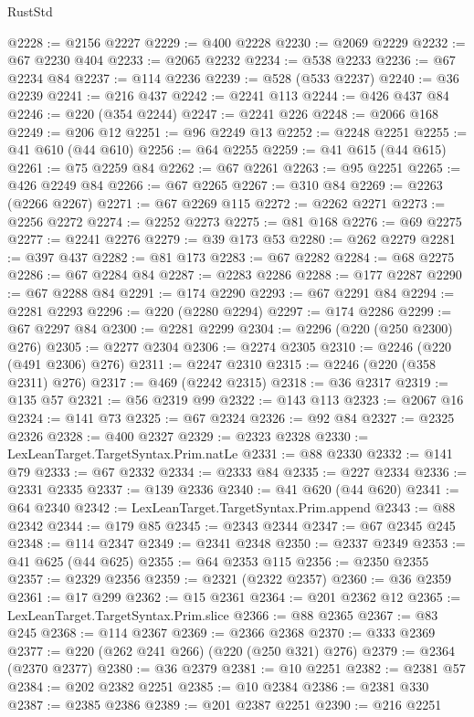 \begin{lexlean}{RustStd}
\begin{coremodule}
{\begin{coremodule}
{{{{{{{{{{{{{{{{{{{{{{{{{{@2228 := @2156 @2227
@2229 := @400 @2228
@2230 := @2069 @2229
@2232 := @67 @2230 @404
@2233 := @2065 @2232
@2234 := @538 @2233
@2236 := @67 @2234 @84
@2237 := @114 @2236
@2239 := @528 (@533 @2237)
@2240 := @36 @2239
@2241 := @216 @437
@2242 := @2241 @113
@2244 := @426 @437 @84
@2246 := @220 (@354 @2244)
@2247 := @2241 @226
@2248 := @2066 @168
@2249 := @206 @12
@2251 := @96 @2249 @13
@2252 := @2248 @2251
@2255 := @41 @610 (@44 @610)
@2256 := @64 @2255
@2259 := @41 @615 (@44 @615)
@2261 := @75 @2259 @84
@2262 := @67 @2261
@2263 := @95 @2251
@2265 := @426 @2249 @84
@2266 := @67 @2265
@2267 := @310 @84
@2269 := @2263 (@2266 @2267)
@2271 := @67 @2269 @115
@2272 := @2262 @2271
@2273 := @2256 @2272
@2274 := @2252 @2273
@2275 := @81 @168
@2276 := @69 @2275
@2277 := @2241 @2276
@2279 := @39 @173 @53
@2280 := @262 @2279
@2281 := @397 @437
@2282 := @81 @173
@2283 := @67 @2282
@2284 := @68 @2275
@2286 := @67 @2284 @84
@2287 := @2283 @2286
@2288 := @177 @2287
@2290 := @67 @2288 @84
@2291 := @174 @2290
@2293 := @67 @2291 @84
@2294 := @2281 @2293
@2296 := @220 (@2280 @2294)
@2297 := @174 @2286
@2299 := @67 @2297 @84
@2300 := @2281 @2299
@2304 := @2296 (@220 (@250 @2300) @276)
@2305 := @2277 @2304
@2306 := @2274 @2305
@2310 := @2246 (@220 (@491 @2306) @276)
@2311 := @2247 @2310
@2315 := @2246 (@220 (@358 @2311) @276)
@2317 := @469 (@2242 @2315)
@2318 := @36 @2317
@2319 := @135 @57
@2321 := @56 @2319 @99
@2322 := @143 @113
@2323 := @2067 @16
@2324 := @141 @73
@2325 := @67 @2324
@2326 := @92 @84
@2327 := @2325 @2326
@2328 := @400 @2327
@2329 := @2323 @2328
@2330 := LexLeanTarget.TargetSyntax.Prim.natLe
@2331 := @88 @2330
@2332 := @141 @79
@2333 := @67 @2332
@2334 := @2333 @84
@2335 := @227 @2334
@2336 := @2331 @2335
@2337 := @139 @2336
@2340 := @41 @620 (@44 @620)
@2341 := @64 @2340
@2342 := LexLeanTarget.TargetSyntax.Prim.append
@2343 := @88 @2342
@2344 := @179 @85
@2345 := @2343 @2344
@2347 := @67 @2345 @245
@2348 := @114 @2347
@2349 := @2341 @2348
@2350 := @2337 @2349
@2353 := @41 @625 (@44 @625)
@2355 := @64 @2353 @115
@2356 := @2350 @2355
@2357 := @2329 @2356
@2359 := @2321 (@2322 @2357)
@2360 := @36 @2359
@2361 := @17 @299
@2362 := @15 @2361
@2364 := @201 @2362 @12
@2365 := LexLeanTarget.TargetSyntax.Prim.slice
@2366 := @88 @2365
@2367 := @83 @245
@2368 := @114 @2367
@2369 := @2366 @2368
@2370 := @333 @2369
@2377 := @220 (@262 @241 @266) (@220 (@250 @321) @276)
@2379 := @2364 (@2370 @2377)
@2380 := @36 @2379
@2381 := @10 @2251
@2382 := @2381 @57
@2384 := @202 @2382 @2251
@2385 := @10 @2384
@2386 := @2381 @330
@2387 := @2385 @2386
@2389 := @201 @2387 @2251
@2390 := @216 @2251
}}}}}}}}}}}}}}}}}}}}}}}}}}
\end{coremodule}}
\end{coremodule}
\end{lexlean}
